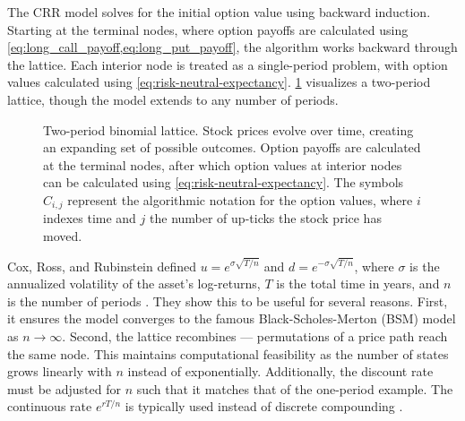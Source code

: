 \documentclass[english,12pt,a4paper,pdftex,sci,utf8]{aaltothesis}
\begin{document}
The CRR model solves for the initial option value using backward induction. Starting at the terminal nodes, where option payoffs are calculated using \cref{eq:long_call_payoff,eq:long_put_payoff}, the algorithm works backward through the lattice. Each interior node is treated as a single-period problem, with option values calculated using \cref{eq:risk-neutral-expectancy}. \cref{fig:crr-twoperiod} visualizes a two-period lattice, though the model extends to any number of periods.

\begin{figure}[bp]
    \centering
        \caption{Two-period binomial lattice. Stock prices evolve over time, creating an expanding set of possible outcomes. Option payoffs are calculated at the terminal nodes, after which option values at interior nodes can be calculated using \cref{eq:risk-neutral-expectancy}. The symbols $C_{i,j}$ represent the algorithmic notation for the option values, where $i$ indexes time and $j$ the number of up-ticks the stock price has moved.}
    \label{fig:crr-twoperiod}
\end{figure}
Cox, Ross, and Rubinstein defined $u = e^{\sigma\sqrt{T/n}}$ and $d = e^{-\sigma\sqrt{T/n}}$, where $\sigma$ is the annualized volatility of the asset's log-returns, $T$ is the total time in years, and $n$ is the number of periods \cite{cox1979option}. They show this to be useful for several reasons. First, it ensures the model converges to the famous Black-Scholes-Merton (BSM) model as $n \rightarrow \infty$. Second, the lattice recombines --- permutations of a price path reach the same node. This maintains computational feasibility as the number of states grows linearly with $n$ instead of exponentially. Additionally, the discount rate must be adjusted for $n$ such that it matches that of the one-period example. The continuous rate $e^{rT/n}$ is typically used instead of discrete compounding \cite{hull2013fundamentals}.
\end{document}
